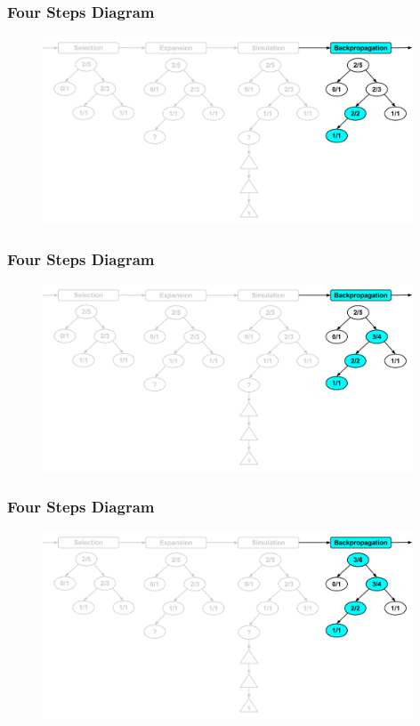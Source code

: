 \documentclass{beamer}
\begin{document}
\begin{frame}[fragile]
\frametitle{Four Steps Diagram}
\begin{figure}[h]
	\includegraphics[width=11cm]{Diagrams/FourSteps/MCTSFourStepProcessFourTwo.pdf}
	\centering
\end{figure}
\end{frame}

\begin{frame}[fragile]
\frametitle{Four Steps Diagram}
\begin{figure}[h]
	\includegraphics[width=11cm]{Diagrams/FourSteps/MCTSFourStepProcessFourThree.pdf}
	\centering
\end{figure}
\end{frame}

\begin{frame}[fragile]
\frametitle{Four Steps Diagram}
\begin{figure}[h]
	\includegraphics[width=11cm]{Diagrams/FourSteps/MCTSFourStepProcessFourFour.pdf}
	\centering
\end{figure}
\end{frame}
\end{document}
